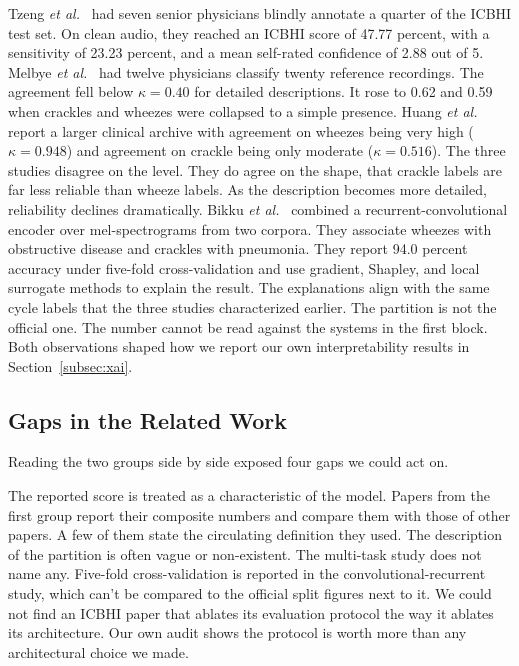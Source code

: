 \documentclass[journal,onecolumn]{IEEEtran}
\begin{document}
Tzeng \emph{et al.}~\cite{tzeng2025jmir} had seven senior physicians blindly annotate a
quarter of the ICBHI test set. On clean audio, they reached an ICBHI score of 47.77
percent, with a sensitivity of 23.23 percent, and a mean self-rated confidence of 2.88
out of 5. Melbye \emph{et al.}~\cite{melbye2016kappa} had twelve physicians classify
twenty reference recordings. The agreement fell below $\kappa = 0.40$ for detailed
descriptions. It rose to 0.62 and 0.59 when crackles and wheezes were collapsed to a
simple presence. Huang \emph{et al.}~\cite{huang2024crackles} report a larger clinical
archive with agreement on wheezes being very high ($\kappa = 0.948$) and agreement on
crackle being only moderate ($\kappa = 0.516$). The three studies disagree on the
level. They do agree on the shape, that crackle labels are far less reliable than
wheeze labels. As the description becomes more detailed, reliability declines
dramatically. Bikku \emph{et al.}~\cite{scirep2025cnnrnn} combined a recurrent-convolutional 
encoder over mel-spectrograms from two corpora. They associate wheezes
with obstructive disease and crackles with pneumonia. They report 94.0 percent accuracy
under five-fold cross-validation and use gradient, Shapley, and local surrogate methods
to explain the result. The explanations align with the same cycle labels that the three
studies characterized earlier. The partition is not the official one. The number
cannot be read against the systems in the first block. Both observations shaped how we
report our own interpretability results in Section~\ref{subsec:xai}.

\subsection{Gaps in the Related Work}
\label{subsec:gaps}

Reading the two groups side by side exposed four gaps we could act on.

The reported score is treated as a characteristic of the model. Papers from the first
group report their composite numbers and compare them with those of other papers. A
few of them state the circulating definition they used. The description of the
partition is often vague or non-existent. The multi-task study does not name any.
Five-fold cross-validation is reported in the convolutional-recurrent study, which
can't be compared to the official split figures next to it. We could not find an ICBHI
paper that ablates its evaluation protocol the way it ablates its architecture. Our own
audit shows the protocol is worth more than any architectural choice we made.
\end{document}
